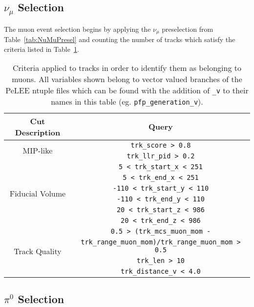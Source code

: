 
\subsection{$\nu_{\mu}$ Selection}
\label{appendix:NuMuSelection}

The muon event selection begins by applying the $\nu_{\mu}$ preselection from Table~\ref{tab:NuMuPresel} and counting the number of tracks which satisfy the criteria listed in Table~\ref{tab:MuonTrackReq}.

\renewcommand{\arraystretch}{1.4}
\begin{table}[H]
    \centering
    \begin{tabular}{c|c}
        \hline
        Cut Description & Query \\
        \hline
        \hline
        \multirow{2}{*}{MIP-like} & \verb|trk_score > 0.8| \\
        & \verb|trk_llr_pid > 0.2| \\
        \hline
        \multirow{6}{*}{Fiducial Volume} & \verb|5 < trk_start_x < 251| \\
        & \verb|5 < trk_end_x < 251| \\
        & \verb|-110 < trk_start_y < 110| \\
        & \verb|-110 < trk_end_y < 110| \\
        & \verb|20 < trk_start_z < 986| \\
        & \verb|20 < trk_end_z < 986| \\
        \hline
        \multirow{4}{*}{Track Quality} & \verb|0.5 > (trk_mcs_muon_mom -| \\ 
        & \verb|trk_range_muon_mom)/trk_range_muon_mom > 0.5| \\
        & \verb|trk_len > 10| \\
        & \verb|trk_distance_v < 4.0| \\
        \hline
        \hline
    \end{tabular}
    \cprotect\caption{Criteria applied to tracks in order to identify them as belonging to muons. All variables shown belong to vector valued branches of the PeLEE ntuple files which can be found with the addition of \verb|_v| to their names in this table (eg. \verb|pfp_generation_v|).}
    \label{tab:MuonTrackReq}
\end{table}
\renewcommand{\arraystretch}{1.0}

\subsection{$\pi^0$ Selection}
\label{appendix:Pi0Selection}

